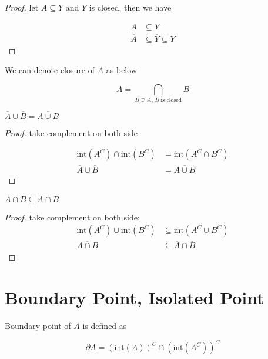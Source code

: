 \documentclass[11pt,a4paper]{article}
\begin{document}
\begin{proof}
    let $A \subseteq Y$ and $Y$ is closed. then we have

    \begin{align*}
        A &\subseteq Y \\
        \overline{A} &\subseteq \overline{Y} \subseteq Y
    \end{align*}
\end{proof}

\begin{corollary}
    We can denote closure of $A$ as below

    \[
        \overline{A} = \bigcap_{B \supseteq A,\, B\; \text{is closed}}B
    \]
\end{corollary}

\begin{lem}
    $\overline{A} \cup \overline{B} = \overline{A \cup B}$
\end{lem}

\begin{proof}
    take complement on both side

    \begin{align*}
        \text{int}(A^C) \cap \text{int}(B^C) &= \text{int}(A^C \cap B^C) \\
        \overline{A} \cup \overline{B} &= \overline{A \cup B}
    \end{align*}
\end{proof}


\begin{lem}
    $\overline{A} \cap \overline{B} \subseteq \overline{A \cap B}$
\end{lem}


\begin{proof}
    take complement on both side:
    \begin{align*}
        \text{int}(A^C) \cup \text{int}(B^C) &\subseteq \text{int}(A^C \cup B^C) \\
        \overline{A \cap B} & \subseteq \overline{A} \cap \overline{B} 
    \end{align*}
\end{proof}

\section{Boundary Point, Isolated Point}

\begin{definition}
    Boundary point of $A$ is defined as 
    
    \[
    \partial A = \left(\text{int}(A) \right)^C \cap \left(\text{int}(A^C) \right)^C
    \]
\end{definition}
\end{document}
